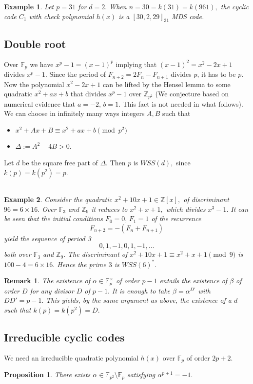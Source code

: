 \documentclass[12pt,reqno]{amsart}
\newtheorem{prop}{Proposition}
\newtheorem{rem}{Remark}
\newtheorem{ex}{Example}
\newcommand{\F}{\mathbb{F}}
\newcommand{\Z}{\mathbb{Z}}
\begin{document}
\begin{ex}{\rm
Let $p=31$ for $d=2.$ When $n=30=k(31)=k(961),$ the cyclic code $C_1$ with check polynomial $h(x)$ is a $[30, 2, 29]_{31}$ MDS code.
}
\end{ex}
\subsection{Double root}
Over $\F_p$ we have $x^p-1=(x-1)^p$ implying that
$(x-1)^2=x^2-2x+1$ divides $x^p-1.$ Since the period of
$F_{n+2}=2F_n-F_{n+1}$ divides $p$, it has to be $p.$
Now the polynomial $x^2-2x+1$ can be lifted by the Hensel lemma
to some quadratic $x^2+ax+b$ that divides $x^p-1$ over $\Z_{p^2}$ (We conjecture  based on numerical evidence that $a=-2,\,b=1.$ This fact is not needed in what follows). We can choose in infinitely many ways integers $A,B$ such that
\begin{itemize}
 \item $x^2+Ax+B \equiv x^2+ax+b \pmod{p^2}$
 \item $\Delta:=A^2-4B>0.$
\end{itemize}
Let $d$ be the square free part of $\Delta.$
Then $p$ is $WSS(d),$ since $k(p)=k(p^2)=p.$\\ \ \

\begin{ex}{\rm
 Consider the quadratic $x^2+10x+1 \in \Z[x],$ of discriminant $96=6\times 16.$ Over $\F_3$ and $\Z_9$ it reduces to $x^2+x+1,$ which divides $x^3-1.$ It can be seen that the initial
conditions $F_0=0,\,F_1=1$ of the recurrence
$$F_{n+2}=-(F_n+F_{n+1})$$
yield the sequence of period 3
$$ 0, 1, -1, 0, 1, -1, \dots$$
both over $\F_3$ and $\Z_9.$
The discriminant of $x^2+10x+1 \equiv x^2+x+1 \pmod{9}$ is
$100-4=6\times 16.$ Hence the prime $3$ is $WSS(6)^*.$
}
\end{ex}

\begin{rem}\label{triv}{\rm
 The existence of $\alpha \in \F_p^\times$ of order $p-1$
 entails the existence of $\beta $ of order $D$ for any divisor $D$ of $p-1.$ It is enough to take $\beta=\alpha^{D'}$ with $DD'=p-1.$ This yields, by the same argument as above, the existence
 of a $d$ such that $k(p)=k(p^2)=D.$
 }
\end{rem}

\subsection{Irreducible cyclic codes}\label{subsec-irr-cyc}
We need an irreducible quadratic polynomial $h(x)$ over $\F_p$ of order ${2p+2}$.
\begin{prop}
 There exists $\alpha \in \F_{p^2}\setminus \F_p$ satisfying $\alpha^{p+1}=-1.$
 \end{prop}
\end{document}
